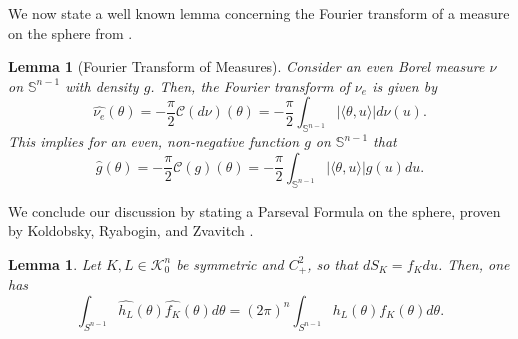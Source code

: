 \documentclass[11pt]{amsart}
\newtheorem{lemma}[theorem]{Lemma}
\theoremstyle{definition}
\theoremstyle{remark}
\numberwithin{equation}{section}
\newcommand{\s}{\mathbb{S}}
\newcommand{\conbod}{\mathcal{K}^n}
\newcommand{\ct}[2]{\mathcal{C}({#1})({#2})}
\begin{document}
We now state a well known lemma concerning the Fourier transform of a measure on the sphere from \cite{KRZ04_2}.
\begin{lemma}[Fourier Transform of Measures]
Consider an even Borel measure $\nu$ on $\s^{n-1}$ with density $g$. Then, the Fourier transform of $\nu_e$ is given by
\begin{equation*}
\widehat{\nu_e}(\theta)=-\frac{\pi}{2}\ct{d\nu}{\theta}=-\frac{\pi}{2}\int_{\s^{n-1}}|\langle\theta,u\rangle|d\nu(u).
\end{equation*}
This implies for an even, non-negative function $g$ on $\s^{n-1}$ that
\begin{equation*}
\widehat{g}(\theta)=-\frac{\pi}{2}\ct{g}{\theta}=-\frac{\pi}{2}\int_{\s^{n-1}}|\langle\theta,u\rangle|g(u)du.
\end{equation*}
\label{lem:for_cos}
\end{lemma}

We conclude our discussion by stating a Parseval Formula on the sphere, proven by Koldobsky, Ryabogin, and Zvavitch \cite{KRZ04_1}.
\begin{lemma}
\label{l:par}
Let $K, L\in\conbod_0$ be symmetric and $C^2_+$, so that $dS_K=f_K du$. Then, one has
$$\int_{S^{n-1}} \widehat{h_{L}}(\theta) \widehat{f_{K}}(\theta) d \theta=(2 \pi)^{n} \int_{S^{n-1}} h_{L}(\theta) f_{K}(\theta) d \theta.$$
\end{lemma}
\end{document}
